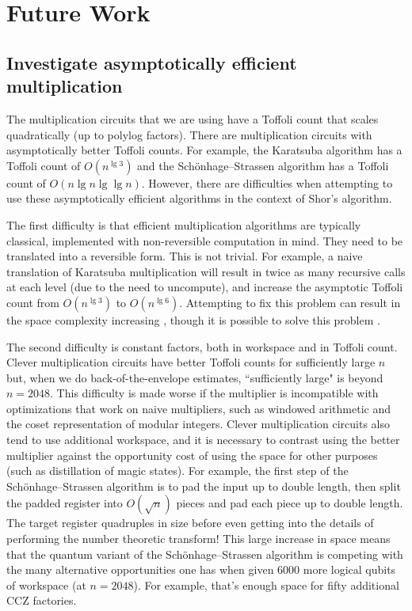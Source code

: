 \documentclass[superscriptaddress,notitlepage,longbibliography]{revtex4-1}
\theoremstyle{definition}
\theoremstyle{definition}
\begin{document}
\section{Future Work}
\label{sec:future-work}

\subsection{Investigate asymptotically efficient multiplication}

The multiplication circuits that we are using have a Toffoli count that scales quadratically (up to polylog factors).
There are multiplication circuits with asymptotically better Toffoli counts.
For example, the Karatsuba algorithm \cite{karatsuba1962multiplication} has a Toffoli count of $O(n^{\lg 3})$ and the Schönhage–Strassen algorithm \cite{schonhage1971multiply} has a Toffoli count of $O(n \lg n \lg \lg n)$.
However, there are difficulties when attempting to use these asymptotically efficient algorithms in the context of Shor's algorithm.

The first difficulty is that efficient multiplication algorithms are typically classical, implemented with non-reversible computation in mind.
They need to be translated into a reversible form.
This is not trivial.
For example, a naive translation of Karatsuba multiplication will result in twice as many recursive calls at each level (due to the need to uncompute), and increase the asymptotic Toffoli count from $O(n^{\lg 3})$ to $O(n^{\lg 6})$.
Attempting to fix this problem can result in the space complexity increasing \cite{parent2017karatsuba}, though it is possible to solve this problem \cite{gidney2019karatsuba}.

The second difficulty is constant factors, both in workspace and in Toffoli count.
Clever multiplication circuits have better Toffoli counts for sufficiently large $n$ but, when we do back-of-the-envelope estimates, ``sufficiently large" is beyond $n=2048$.
This difficulty is made worse if the multiplier is incompatible with optimizations that work on naive multipliers, such as windowed arithmetic and the coset representation of modular integers.
Clever multiplication circuits also tend to use additional workspace, and it is necessary to contrast using the better multiplier against the opportunity cost of using the space for other purposes (such as distillation of magic states).
For example, the first step of the Schönhage–Strassen algorithm is to pad the input up to double length, then split the padded register into $O(\sqrt{n})$ pieces and pad each piece up to double length.
The target register quadruples in size before even getting into the details of performing the number theoretic transform!
This large increase in space means that the quantum variant of the Schönhage–Strassen algorithm is competing with the many alternative opportunities one has when given 6000 more logical qubits of workspace (at $n=2048$).
For example, that's enough space for fifty additional CCZ factories.
\end{document}
